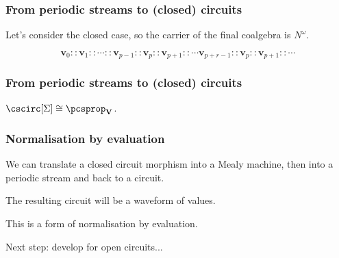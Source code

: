 \begin{frame}
    \frametitle{From periodic streams to (closed) circuits}

    Let's consider the \alert{closed} case, so the carrier of the final coalgebra is $N^\omega$.

    \pause

    \[ \textbf{v}_0 :: \textbf{v}_1 :: \cdots :: \textbf{v}_{p-1} :: \textbf{v}_{p} :: \textbf{v}_{p+1} :: \cdots \textbf{v}_{p+r-1} :: \textbf{v}_{p} :: \textbf{v}_{p+1} :: \cdots\]

    \pause

    \begin{center}
    \end{center}

\end{frame}

\begin{frame}
    \frametitle{From periodic streams to (closed) circuits}
        \pause

        \begin{center}

            \pause

            \vspace{1em}

            \pause

        \end{center}
    

        \begin{theorem}
            $\cscirc[\Sigma] \cong {\pcsprop}_{\textbf{V}}$.
        \end{theorem}
\end{frame}

\begin{frame}
    \frametitle{Normalisation by evaluation}

    \pause

    We can translate a closed circuit morphism into a Mealy machine, then into a periodic stream and back to a circuit.

    \pause

    The resulting circuit will be a \alert{waveform} of values.
    
    \pause

    This is a form of \alert{normalisation by evaluation}.

    \pause

    Next step: develop for \alert{open circuits}...

\end{frame}